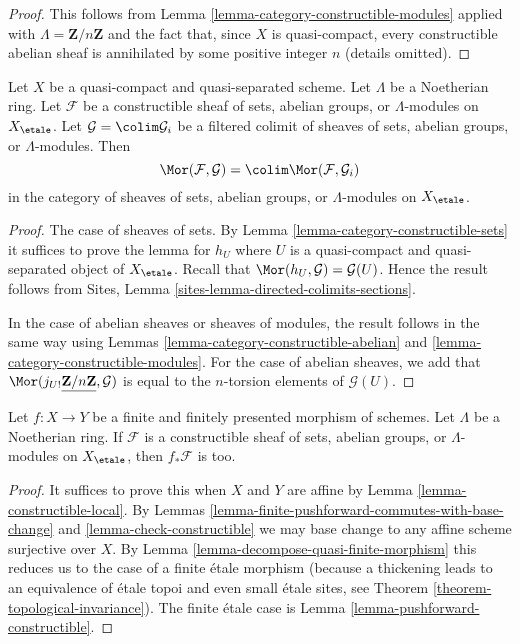 \begin{proof}
This follows from Lemma \ref{lemma-category-constructible-modules}
applied with $\Lambda = \mathbf{Z}/n\mathbf{Z}$
and the fact that, since $X$ is quasi-compact, every constructible
abelian sheaf is annihilated by some positive integer $n$ (details omitted).
\end{proof}

\begin{lemma}
\label{lemma-constructible-is-compact}
Let $X$ be a quasi-compact and quasi-separated scheme. Let $\Lambda$ be a
Noetherian ring. Let $\mathcal{F}$ be a constructible sheaf of sets, abelian
groups, or $\Lambda$-modules on $X_\etale$. Let
$\mathcal{G} = \colim \mathcal{G}_i$ be a filtered colimit of sheaves of
sets, abelian groups, or $\Lambda$-modules. Then
$$
\Mor(\mathcal{F}, \mathcal{G}) = \colim \Mor(\mathcal{F}, \mathcal{G}_i)
$$
in the category of sheaves of sets, abelian groups, or $\Lambda$-modules on
$X_\etale$.
\end{lemma}

\begin{proof}
The case of sheaves of sets. By Lemma \ref{lemma-category-constructible-sets}
it suffices to prove the lemma for $h_U$ where $U$ is a quasi-compact
and quasi-separated object of $X_\etale$. Recall that
$\Mor(h_U, \mathcal{G}) = \mathcal{G}(U)$. Hence the result
follows from Sites, Lemma \ref{sites-lemma-directed-colimits-sections}.

\medskip\noindent
In the case of abelian sheaves or sheaves of modules, the result follows
in the same way using
Lemmas \ref{lemma-category-constructible-abelian} and
\ref{lemma-category-constructible-modules}.
For the case of abelian sheaves, we add that
$\Mor(j_{U!}\underline{\mathbf{Z}/n\mathbf{Z}}, \mathcal{G})$
is equal to the $n$-torsion elements of $\mathcal{G}(U)$.
\end{proof}

\begin{lemma}
\label{lemma-finite-pushforward-constructible}
Let $f : X \to Y$ be a finite and finitely presented morphism of schemes.
Let $\Lambda$ be a Noetherian ring. If $\mathcal{F}$ is a constructible
sheaf of sets, abelian groups, or $\Lambda$-modules on $X_\etale$,
then $f_*\mathcal{F}$ is too.
\end{lemma}

\begin{proof}
It suffices to prove this when $X$ and $Y$ are affine by
Lemma \ref{lemma-constructible-local}.
By
Lemmas \ref{lemma-finite-pushforward-commutes-with-base-change} and
\ref{lemma-check-constructible} we may base change to any
affine scheme surjective over $X$. By
Lemma \ref{lemma-decompose-quasi-finite-morphism}
this reduces us to the case of a finite \'etale morphism
(because a thickening leads to an equivalence of \'etale topoi
and even small \'etale sites, see
Theorem \ref{theorem-topological-invariance}).
The finite \'etale case is
Lemma \ref{lemma-pushforward-constructible}.
\end{proof}

